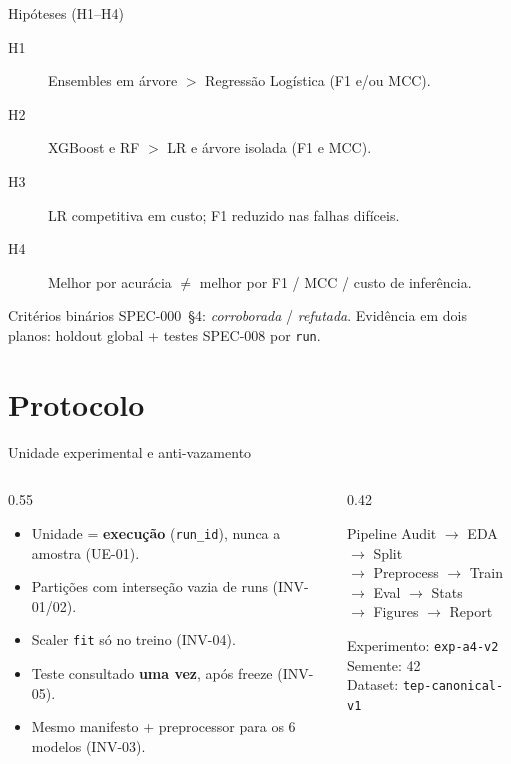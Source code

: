 \documentclass[aspectratio=169,11pt]{beamer}
\begin{document}
\begin{frame}{Hipóteses (H1--H4)}
\begin{description}
  \item[H1] Ensembles em árvore $>$ Regressão Logística (F1 e/ou MCC).
  \item[H2] XGBoost e RF $>$ LR e árvore isolada (F1 e MCC).
  \item[H3] LR competitiva em custo; F1 reduzido nas falhas difíceis.
  \item[H4] Melhor por acurácia $\neq$ melhor por F1 / MCC / custo de inferência.
\end{description}
\bigskip
{\small Critérios binários SPEC-000~\S4: \emph{corroborada} / \emph{refutada}.
Evidência em dois planos: holdout global + testes SPEC-008 por \texttt{run}.}
\end{frame}

\section{Protocolo}
\begin{frame}{Unidade experimental e anti-vazamento}
\begin{columns}[T]
\begin{column}{0.55\textwidth}
\begin{itemize}
  \item Unidade = \textbf{execução} (\texttt{run\_id}), nunca a amostra (UE-01).
  \item Partições com interseção vazia de runs (INV-01/02).
  \item Scaler \texttt{fit} só no treino (INV-04).
  \item Teste consultado \textbf{uma vez}, após freeze (INV-05).
  \item Mesmo manifesto + preprocessor para os 6 modelos (INV-03).
\end{itemize}
\end{column}
\begin{column}{0.42\textwidth}
\begin{block}{Pipeline}
Audit $\to$ EDA $\to$ Split\\
$\to$ Preprocess $\to$ Train\\
$\to$ Eval $\to$ Stats\\
$\to$ Figures $\to$ Report
\end{block}
{\scriptsize Experimento: \texttt{exp-a4-v2}\\
Semente: 42\\
Dataset: \texttt{tep-canonical-v1}}
\end{column}
\end{columns}
\end{frame}
\end{document}
